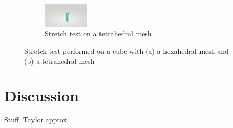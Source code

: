 \begin{figure}[!htbp]
\begin{subfigure}[b]{\textwidth}
        \hfill
        \includegraphics[width=0.24\textwidth]{resources/tetcli_step24.png}
        \caption{Stretch test on a tetrahedral mesh}
    \end{subfigure}
    \caption{Stretch test performed on a cube with (a) a hexahedral mesh and (b) a tetrahedral mesh}
    \label{fig:stretchtest}
\end{figure}





\section{Discussion}
Stuff, Taylor approx.


